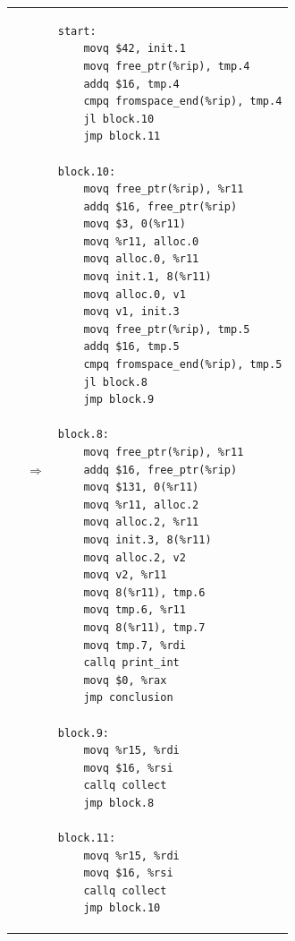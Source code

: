 \documentclass[7x10]{TimesAPriori_MIT}%
\numberwithin{theorem}{chapter}
\numberwithin{definition}{chapter}
\numberwithin{equation}{chapter}
\begin{document}
\begin{figure}[tbp]
\begin{tcolorbox}[colback=white]
{\begin{tabular}{lll}
\begin{minipage}{0.5\textwidth}
\end{minipage}
&$\Rightarrow$&
\begin{minipage}{0.4\textwidth}
  \begin{lstlisting}[basicstyle=\ttfamily\scriptsize]
start:
    movq $42, init.1
    movq free_ptr(%rip), tmp.4
    addq $16, tmp.4
    cmpq fromspace_end(%rip), tmp.4
    jl block.10
    jmp block.11

block.10:
    movq free_ptr(%rip), %r11
    addq $16, free_ptr(%rip)
    movq $3, 0(%r11)
    movq %r11, alloc.0
    movq alloc.0, %r11
    movq init.1, 8(%r11)
    movq alloc.0, v1
    movq v1, init.3
    movq free_ptr(%rip), tmp.5
    addq $16, tmp.5
    cmpq fromspace_end(%rip), tmp.5
    jl block.8
    jmp block.9

block.8:
    movq free_ptr(%rip), %r11
    addq $16, free_ptr(%rip)
    movq $131, 0(%r11)
    movq %r11, alloc.2
    movq alloc.2, %r11
    movq init.3, 8(%r11)
    movq alloc.2, v2
    movq v2, %r11
    movq 8(%r11), tmp.6
    movq tmp.6, %r11
    movq 8(%r11), tmp.7
    movq tmp.7, %rdi
    callq print_int
    movq $0, %rax
    jmp conclusion

block.9:
    movq %r15, %rdi
    movq $16, %rsi
    callq collect
    jmp block.8

block.11:
    movq %r15, %rdi
    movq $16, %rsi
    callq collect
    jmp block.10
\end{lstlisting}






\end{minipage}
\end{tabular}}
\end{tcolorbox}
\end{figure}
\end{document}

